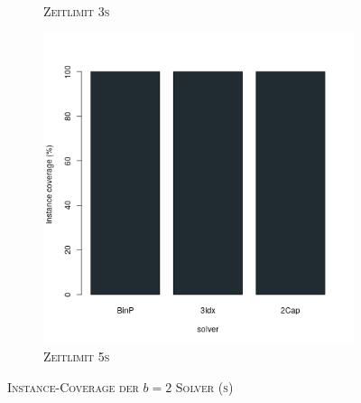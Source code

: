 \begin{figure}[H]
\begin{subfigure}[b]{0.3\textwidth}
\caption{\textsc{Zeitlimit 3s}}
\label{fig:instance_cov_b=2_s_b}
\end{subfigure}
\hfill
\begin{subfigure}[b]{0.3\textwidth}
\centering
\includegraphics[width=1.2\textwidth]{img/solver_instance_coverage_b=2_s_5s.png}
\caption{\textsc{Zeitlimit 5s}}
\label{fig:instance_cov_b=2_s_c}
\end{subfigure}

\caption{\textsc{Instance-Coverage der $b=2$ Solver (s)}}
\label{fig:instance_cov_b=2_s}
\end{figure}

